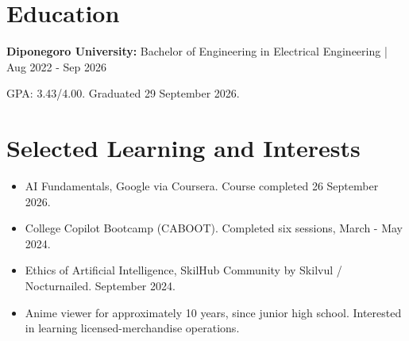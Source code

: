 \documentclass[11pt,a4paper]{article}
\begin{document}
\section{Education}
\textbf{Diponegoro University:} Bachelor of Engineering in Electrical Engineering | Aug 2022 - Sep 2026\par
GPA: 3.43/4.00. Graduated 29 September 2026.
\section{Selected Learning and Interests}
\begin{itemize}
\item AI Fundamentals, Google via Coursera. Course completed 26 September 2026.
\item College Copilot Bootcamp (CABOOT). Completed six sessions, March - May 2024.
\item Ethics of Artificial Intelligence, SkilHub Community by Skilvul / Nocturnailed. September 2024.
\item Anime viewer for approximately 10 years, since junior high school. Interested in learning licensed-merchandise operations.
\end{itemize}
\end{document}

